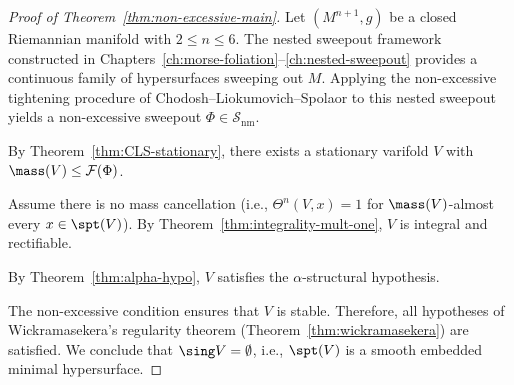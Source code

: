 \begin{proof}[Proof of Theorem~\ref{thm:non-excessive-main}]
Let $(M^{n+1}, g)$ be a closed Riemannian manifold with $2 \leq n \leq 6$. The nested sweepout
framework constructed in Chapters~\ref{ch:morse-foliation}--\ref{ch:nested-sweepout} provides a continuous
family of hypersurfaces sweeping out $M$. Applying the non-excessive tightening procedure of
Chodosh--Liokumovich--Spolaor to this nested sweepout yields a non-excessive sweepout
$\Phi \in \mathcal{S}_{\text{nm}}$.

By Theorem~\ref{thm:CLS-stationary}, there exists a stationary varifold $V$ with $\mass(V) \leq \mathcal{F}(\Phi)$.

Assume there is no mass cancellation (i.e., $\Theta^n(V,x)=1$ for $\mass(V)$-almost every $x \in \spt(V)$).
By Theorem~\ref{thm:integrality-mult-one}, $V$ is integral and rectifiable.

By Theorem~\ref{thm:alpha-hypo}, $V$ satisfies the $\alpha$-structural hypothesis.

The non-excessive condition ensures that $V$ is stable. Therefore, all hypotheses of Wickramasekera's regularity
theorem (Theorem~\ref{thm:wickramasekera}) are satisfied. We conclude that $\sing V = \emptyset$, i.e., $\spt(V)$
is a smooth embedded minimal hypersurface.
\end{proof}

